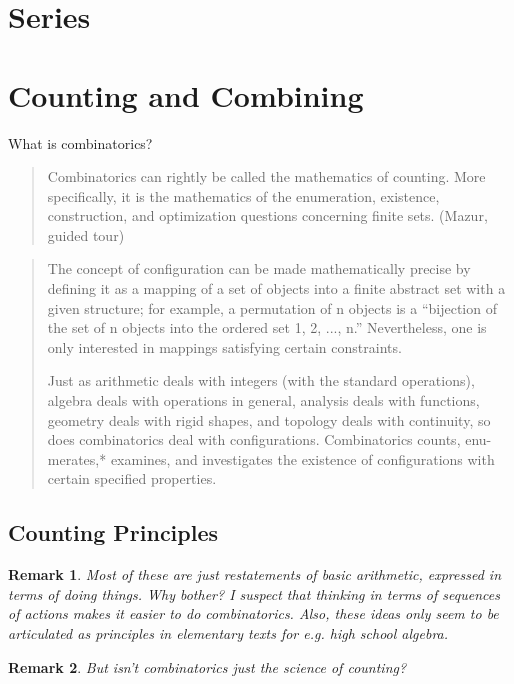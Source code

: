 \documentclass[reqno,12pt]{article}
\numberwithin{equation}{subsection}
\newtheorem{remark}{Remark}
\begin{document}
\section{Series}

\section{Counting and Combining}

\parencite{berge_principles_1971}

What is combinatorics?

\blockquote{Combinatorics can rightly be called the mathematics of counting. More speciﬁcally, it
is the mathematics of the enumeration, existence, construction, and optimization questions
concerning ﬁnite sets. (Mazur, guided tour)}

\blockquote{The concept of configuration can be made mathematically precise by defining it as a mapping of a set of objects into a finite abstract set with a given structure; for example, a permutation of n objects is a “bijection of the set of n objects into the ordered set 1, 2, ..., n.” Nevertheless, one is only interested in mappings satisfying certain constraints.

Just as arithmetic deals with integers (with the standard operations), algebra deals with operations in general, analysis deals with functions, geometry deals with rigid shapes, and topology deals with continuity, so does combinatorics deal with configurations. Combinatorics counts, enu- merates,* examines, and investigates the existence of configurations with certain specified properties.
}

\subsection{Counting Principles}

\begin{remark}
  Most of these are just restatements of basic arithmetic, expressed
  in terms of doing things.  Why bother?  I suspect that thinking in
  terms of sequences of actions makes it easier to do combinatorics.
  Also, these ideas only seem to be articulated as principles in
  elementary texts for e.g. high school algebra.
\end{remark}

\begin{remark}
  But isn't combinatorics just the science of counting?
\end{remark}
\end{document}
